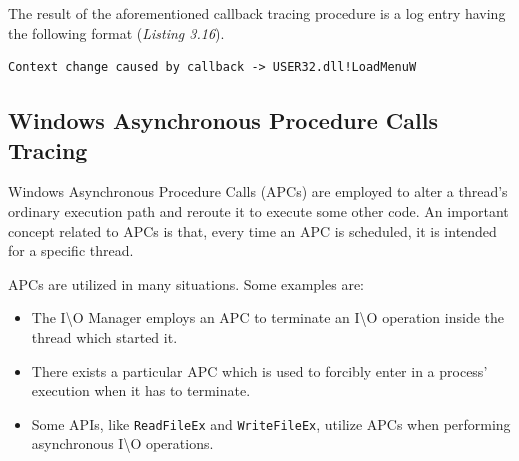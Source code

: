 The result of the aforementioned callback tracing procedure is a log entry having the following format (\textit{Listing 3.16}).
\\
\begin{lstlisting}[caption={Log entry relative to a user mode callback},captionpos=b]
Context change caused by callback -> USER32.dll!LoadMenuW
\end{lstlisting}


\subsection{Windows Asynchronous Procedure Calls Tracing}

Windows Asynchronous Procedure Calls (APCs) are employed to alter a thread's ordinary execution path and reroute it to execute some other code. An important concept related to APCs is that, every time an APC is scheduled, it is intended for a specific thread.

APCs are utilized in many situations. Some examples are:

\begin{itemize}
\item The I{\textbackslash}O Manager employs an APC to terminate an I{\textbackslash}O operation inside the thread which started it.
\item There exists a particular APC which is used to forcibly enter in a process' execution when it has to terminate.
\item Some APIs, like \texttt{ReadFileEx} and \texttt{WriteFileEx}, utilize APCs when performing asynchronous I{\textbackslash}O operations.   
\end{itemize} 

